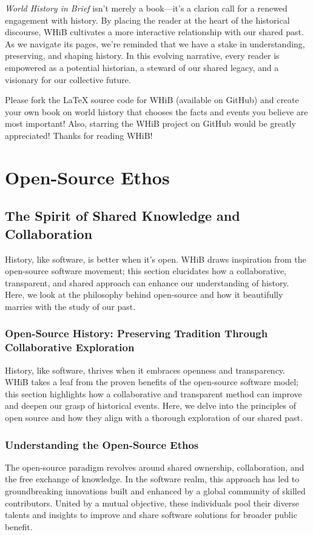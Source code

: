 \documentclass[a4paper,12pt]{book}
\begin{document}
\emph{World History in Brief} isn't merely a book—it's a clarion call for a renewed engagement with history. By placing the reader at the heart of the historical discourse, WHiB cultivates a more interactive relationship with our shared past. As we navigate its pages, we're reminded that we have a stake in understanding, preserving, and shaping history. In this evolving narrative, every reader is empowered as a potential historian, a steward of our shared legacy, and a visionary for our collective future.

\bigskip
\noindent
Please fork the \LaTeX{} source code for WHiB (available on GitHub) and create your own book on world history that chooses the facts and events you believe are most important! Also, starring the WHiB project on GitHub would be greatly appreciated! Thanks for reading WHiB!

\chapter{Open-Source Ethos}
\section*{The Spirit of Shared Knowledge and Collaboration}
History, like software, is better when it's open. WHiB draws inspiration from the open-source software movement; this section elucidates how a collaborative, transparent, and shared approach can enhance our understanding of history. Here, we look at the philosophy behind open-source and how it beautifully marries with the study of our past.

\subsection*{Open-Source History: Preserving Tradition Through Collaborative Exploration}
History, like software, thrives when it embraces openness and transparency. WHiB takes a leaf from the proven benefits of the open-source software model; this section highlights how a collaborative and transparent method can improve and deepen our grasp of historical events. Here, we delve into the principles of open source and how they align with a thorough exploration of our shared past.

\subsection*{Understanding the Open-Source Ethos}
The open-source paradigm revolves around shared ownership, collaboration, and the free exchange of knowledge. In the software realm, this approach has led to groundbreaking innovations built and enhanced by a global community of skilled contributors. United by a mutual objective, these individuals pool their diverse talents and insights to improve and share software solutions for broader public benefit.
\end{document}
